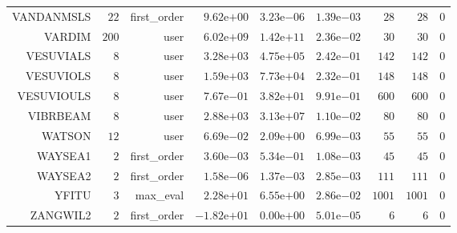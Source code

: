 \begin{longtable}{rrrrrrrrr}
VANDANMSLS & \(    22\) & first\_order & \( 9.62\)e\(+00\) & \( 3.23\)e\(-06\) & \( 1.39\)e\(-03\) & \(    28\) & \(    28\) & \(     0\) \\
VARDIM & \(   200\) & user & \( 6.02\)e\(+09\) & \( 1.42\)e\(+11\) & \( 2.36\)e\(-02\) & \(    30\) & \(    30\) & \(     0\) \\
VESUVIALS & \(     8\) & user & \( 3.28\)e\(+03\) & \( 4.75\)e\(+05\) & \( 2.42\)e\(-01\) & \(   142\) & \(   142\) & \(     0\) \\
VESUVIOLS & \(     8\) & user & \( 1.59\)e\(+03\) & \( 7.73\)e\(+04\) & \( 2.32\)e\(-01\) & \(   148\) & \(   148\) & \(     0\) \\
VESUVIOULS & \(     8\) & user & \( 7.67\)e\(-01\) & \( 3.82\)e\(+01\) & \( 9.91\)e\(-01\) & \(   600\) & \(   600\) & \(     0\) \\
VIBRBEAM & \(     8\) & user & \( 2.88\)e\(+03\) & \( 3.13\)e\(+07\) & \( 1.10\)e\(-02\) & \(    80\) & \(    80\) & \(     0\) \\
WATSON & \(    12\) & user & \( 6.69\)e\(-02\) & \( 2.09\)e\(+00\) & \( 6.99\)e\(-03\) & \(    55\) & \(    55\) & \(     0\) \\
WAYSEA1 & \(     2\) & first\_order & \( 3.60\)e\(-03\) & \( 5.34\)e\(-01\) & \( 1.08\)e\(-03\) & \(    45\) & \(    45\) & \(     0\) \\
WAYSEA2 & \(     2\) & first\_order & \( 1.58\)e\(-06\) & \( 1.37\)e\(-03\) & \( 2.85\)e\(-03\) & \(   111\) & \(   111\) & \(     0\) \\
YFITU & \(     3\) & max\_eval & \( 2.28\)e\(+01\) & \( 6.55\)e\(+00\) & \( 2.86\)e\(-02\) & \(  1001\) & \(  1001\) & \(     0\) \\
ZANGWIL2 & \(     2\) & first\_order & \(-1.82\)e\(+01\) & \( 0.00\)e\(+00\) & \( 5.01\)e\(-05\) & \(     6\) & \(     6\) & \(     0\) \\\hline
\end{longtable}

